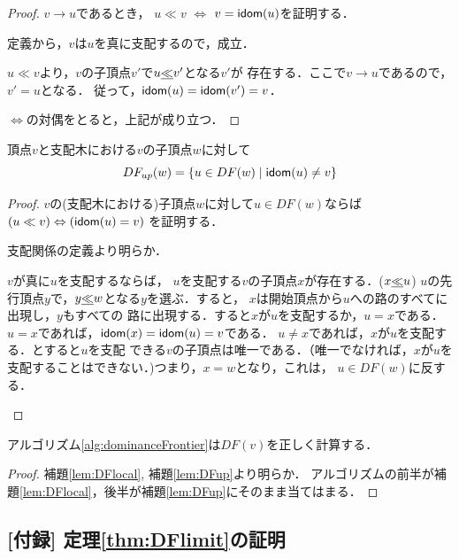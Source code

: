 \documentclass[dvipdfmx,a4j]{jbook}
\begin{document}
\begin{proof}
    $v\rightarrow u$であるとき，
$u\ll v$ $\Leftrightarrow$ $v=\mathsf{idom}({u})$を証明する．
\begin{trivlist}
    \item[($\Leftarrow$)] 定義から，$v$は$u$を真に支配するので，成立．
    \item[($\Rightarrow$)] $u\ll v$より，$v$の子頂点$v'$で$u\underline{\ll} v'$となる$v'$が
    存在する．ここで$v\rightarrow u$であるので，$v'=u$となる．
    従って，$\mathsf{idom}({u})=\mathsf{idom}({v'})=v$．
\end{trivlist}
    $\Leftrightarrow$の対偶をとると，上記が成り立つ．
\end{proof}

\begin{Lem}\label{lem:DFup}
    頂点$v$と支配木における$v$の子頂点$w$に対して
    \[
        DF_{up}(w)=\{u\in DF(w)\;|\;\mathsf{idom}({u})\not= v\}
    \]
\end{Lem}

\begin{proof}
    $v$の(支配木における)子頂点$w$に対して$u\in DF(w)$ならば
    $(u\ll v)\Leftrightarrow (\mathsf{idom}({u})=v)$ を証明する．
    \begin{trivlist}
    \item[($\Leftarrow$)] 支配関係の定義より明らか．
    \item[($\Rightarrow$)] $v$が真に$u$を支配するならば，
    $u$を支配する$v$の子頂点$x$が存在する．($x\underline{\ll} u$)
    $u$の先行頂点$y$で，$y\underline{\ll} w$となる$y$を選ぶ．すると，
    $x$は開始頂点から$u$への路のすべてに出現し，$y$もすべての
    路に出現する．すると$x$が$u$を支配するか，$u=x$である．
    $u=x$であれば，$\mathsf{idom}({x})=\mathsf{idom}({u})=v$である．
    $u\not=x$であれば，$x$が$u$を支配する．とすると$u$を支配
    できる$v$の子頂点は唯一である．（唯一でなければ，$x$が$u$を
    支配することはできない．)つまり，$x=w$となり，これは，
    $u\in DF(w)$に反する．
    \end{trivlist}
\end{proof}

\begin{Thm}
    アルゴリズム\ref{alg:dominanceFrontier}は$DF(v)$を正しく計算する．
\end{Thm}
\begin{proof}
    補題\ref{lem:DFlocal}, 補題\ref{lem:DFup}より明らか．
    アルゴリズムの前半が補題\ref{lem:DFlocal}，後半が補題\ref{lem:DFup}にそのまま当てはまる．
\end{proof}

\subsection*{[付録] 定理\ref{thm:DFlimit}の証明}
\end{document}
